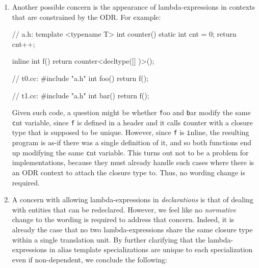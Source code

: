 \documentclass{wg21}
\newcommand{\cc}[1]{\texttt{#1}}
\begin{document}
\begin{enumerate}
  Thus, a function template declaration such as the following will require the
  implementation to make the lambda-expression part of the signature, which is
  specifically what we would like to avoid:
\begin{cpp}
template <unsigned N>
void f(const char (*s)[([]() { return N; })()]) { }
\end{cpp}

  To make sure this does not happen, we propose \hyperref[wording.template]
  {amending \textbf{[temp.over.link]}}.


  \item \label{discussion.ODR}
  Another possible concern is the appearance of lambda-expressions in
  contexts that are constrained by the ODR. For example:

\begin{cpp}
// a.h:
template <typename T>
int counter() {
  static int cnt = 0;
  return cnt++;
}

inline int f() {
  return counter<decltype([] {})>();
}

// t0.cc:
#include "a.h"
int foo() { return f(); }

// t1.cc:
#include "a.h"
int bar() { return f(); }
\end{cpp}

  Given such code, a question might be whether \cc foo and \cc bar modify
  the same \cc cnt variable, since \cc f is defined in a header and it calls
  \cc counter with a closure type that is supposed to be unique. However,
  since \cc f is \cc inline, the resulting program is as-if there was a
  single definition of it, and so both functions end up modifying the same
  \cc cnt variable. This turns out not to be a problem for implementations,
  because they must already handle such cases where there is an ODR context
  to attach the closure type to. Thus, no wording change is required.


  \item \label{discussion.redeclarations}
  A concern with allowing lambda-expressions in \textit{declarations} is
  that of dealing with entities that can be redeclared. However, we feel like
  no \textit{normative} change to the wording is required to address that concern.
  Indeed, it is already the case that no two lambda-expressions share the same
  closure type within a single translation unit. By further clarifying that the
  lambda-expressions in alias template specializations are unique to each
  specialization even if non-dependent, we conclude the following:


\end{enumerate}
\end{document}
